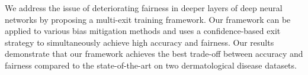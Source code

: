 We address the issue of deteriorating fairness in deeper layers of deep neural networks by proposing a multi-exit training framework. Our framework can be applied to various bias mitigation methods and uses a confidence-based exit strategy to simultaneously achieve high accuracy and fairness. Our results demonstrate that our framework achieves the best trade-off between accuracy and fairness compared to the state-of-the-art on two dermatological disease datasets.

